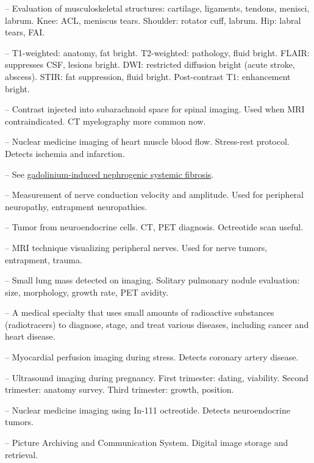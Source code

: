 -- Evaluation of musculoskeletal structures: cartilage, ligaments, tendons, menisci, labrum. Knee: ACL, meniscus tears. Shoulder: rotator cuff, labrum. Hip: labral tears, FAI.

-- T1-weighted: anatomy, fat bright. T2-weighted: pathology, fluid bright. FLAIR: suppresses CSF, lesions bright. DWI: restricted diffusion bright (acute stroke, abscess). STIR: fat suppression, fluid bright. Post-contrast T1: enhancement bright.

-- Contrast injected into subarachnoid space for spinal imaging. Used when MRI contraindicated. CT myelography more common now.

-- Nuclear medicine imaging of heart muscle blood flow. Stress-rest protocol. Detects ischemia and infarction.

-- See \hyperlink{Gadolinium-Induced Nephrogenic Systemic Fibrosis}{gadolinium-induced nephrogenic systemic fibrosis}.

-- Measurement of nerve conduction velocity and amplitude. Used for peripheral neuropathy, entrapment neuropathies.

-- Tumor from neuroendocrine cells. CT, PET diagnosis. Octreotide scan useful.

-- MRI technique visualizing peripheral nerves. Used for nerve tumors, entrapment, trauma.

-- Small lung mass detected on imaging. Solitary pulmonary nodule evaluation: size, morphology, growth rate, PET avidity.

-- A medical specialty that uses small amounts of radioactive substances (radiotracers) to diagnose, stage, and treat various diseases, including cancer and heart disease.

-- Myocardial perfusion imaging during stress. Detects coronary artery disease.

-- Ultrasound imaging during pregnancy. First trimester: dating, viability. Second trimester: anatomy survey. Third trimester: growth, position.

-- Nuclear medicine imaging using In-111 octreotide. Detects neuroendocrine tumors.

-- Picture Archiving and Communication System. Digital image storage and retrieval.


